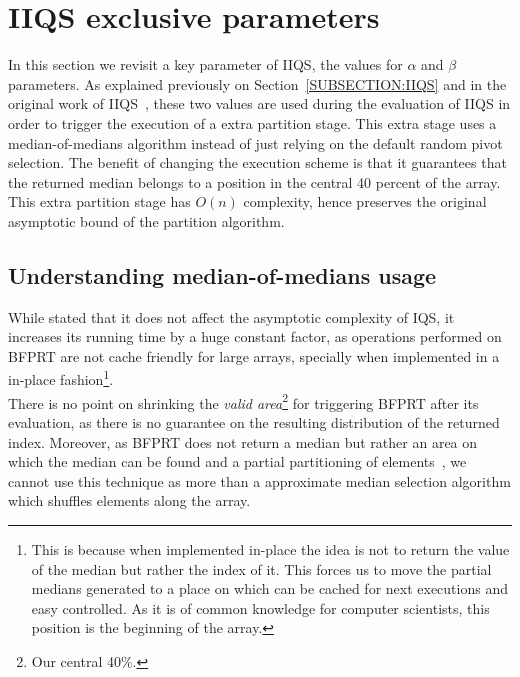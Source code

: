 \section{IIQS exclusive parameters}
\label{SECTION:IQS_PARAMS}

In this section we revisit a key parameter of IIQS, the values for $\alpha$ and $\beta$ parameters. As explained previously on Section~\ref{SUBSECTION:IIQS} and in the original work of IIQS~\cite{7416566}, these two values are used during the evaluation of IIQS in order to trigger the execution of a extra partition stage. This extra stage uses a median-of-medians algorithm instead of just relying on the default random pivot selection. The benefit of changing the execution scheme is that it guarantees that the returned median belongs to a position in the central 40 percent of the array.  This extra partition stage has $O(n)$ complexity, hence preserves the original asymptotic bound of the partition algorithm.\\

\subsection{Understanding median-of-medians usage}

While stated that it does not affect the asymptotic complexity of IQS, it increases its running time by a huge constant factor, as operations performed on BFPRT are not cache friendly for large arrays, specially when implemented in a in-place fashion\footnote{This is because when implemented in-place the idea is not to return the value of the median but rather the index of it. This forces us to move the partial medians generated to a place on which can be cached for next executions and easy controlled. As it is of common knowledge for computer scientists, this position is the beginning of the array.}. \\

There is no point on shrinking the \emph{valid area}\footnote{Our central 40\%.} for triggering BFPRT after its evaluation, as there is no guarantee on the resulting distribution of the returned index. Moreover, as BFPRT does not return a median but rather an area on which the median can be found and a partial partitioning of elements~\cite{Blum_Floyd_Pratt_Rivest_Tarjan_1973}, we cannot use this technique as more than a approximate median selection algorithm which shuffles elements along the array.\\


